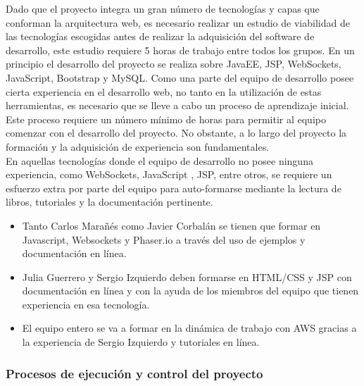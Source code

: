 Dado que el proyecto integra un gran número de tecnologías y capas que conforman la arquitectura web, es necesario realizar un estudio de viabilidad de las tecnologías escogidas antes de realizar la adquisición del software de desarrollo, este estudio requiere  5 horas de trabajo entre todos los grupos.  En un principio el desarrollo del proyecto se realiza sobre JavaEE, JSP, WebSockets, JavaScript, Bootstrap y MySQL. Como una parte del equipo de desarrollo posee cierta experiencia en el desarrollo web, no tanto en la utilización de estas herramientas, es necesario que se lleve a cabo un proceso de aprendizaje inicial. Este proceso requiere un número mínimo de horas para permitir al equipo comenzar con el desarrollo del proyecto. No obstante, a lo largo del proyecto la formación y la adquisición de experiencia son fundamentales.\\

En aquellas tecnologías donde el equipo de desarrollo no posee ninguna experiencia, como WebSockets, JavaScript , JSP,  entre otros, se requiere un esfuerzo extra por parte del equipo para auto-formarse mediante la lectura de libros, tutoriales y la documentación pertinente.\\

\begin{itemize}
	\item Tanto Carlos Marañés como Javier Corbalán se tienen que formar en Javascript, Websockets y Phaser.io a través del uso de ejemplos y documentación en línea.
	\item Julia Guerrero y Sergio Izquierdo deben formarse en HTML/CSS y JSP con documentación en línea y  con la ayuda de los miembros del equipo que tienen experiencia en esa tecnología.
    \item El equipo entero se va a formar en la dinámica de trabajo con AWS gracias a la experiencia de Sergio Izquierdo y tutoriales en línea.
\end{itemize}

\subsubsection{Procesos de ejecución y control del proyecto}

